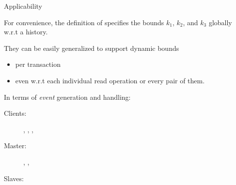\begin{frame}{Applicability}
\end{frame}

\begin{frame}{}
  \resizebox{1.00\textwidth}{!}{}
\end{frame}

\begin{frame}{}
  For convenience, the definition of \rvsi{} specifies the bounds
  $k_1$, $k_2$, and $k_3$ globally w.r.t a history.

  \vspace{0.80cm}
  They can be easily generalized to support dynamic bounds 
  \begin{itemize}
    \item per transaction
    \item even w.r.t each individual read operation or every pair of them.
  \end{itemize}
\end{frame}

\begin{frame}{}
  In terms of \emph{event} generation and handling:
  \begin{description}
    \item[Clients:] \ebegin, \eread, \ewrite, \eend%
    \item[Master:] \estart, \ecommit, \esend%
    \item[Slaves:] \ereceive%
  \end{description}
\end{frame}

\begin{frame}{}
  \begin{center}
    \begin{minipage}{1.0\textwidth}
      
    \end{minipage}
  \end{center}
\end{frame}

\begin{frame}{}
  \begin{center}
  \end{center}
\end{frame}


